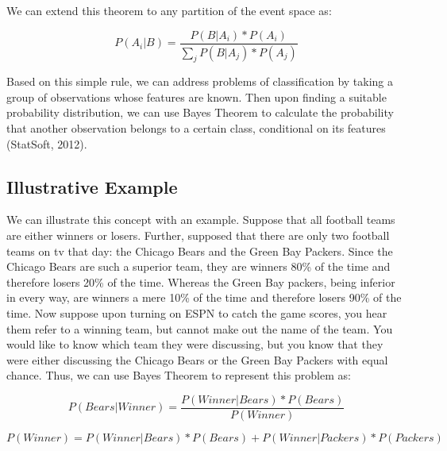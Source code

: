 \begin{flushleft}We can extend this theorem to any partition of the event space as:
\end{flushleft}

\begin{equation}
P(A_{i}|B)=\frac{P(B|A_{i})*P(A_{i})}{\sum_{j}P(B|A_{j})*P(A_{j})}
\end{equation}

\begin{flushleft}Based on this simple rule, we can address problems of classification by taking a group of observations whose features are known. Then upon finding a suitable probability distribution, we can use Bayes Theorem to calculate the probability that another observation belongs to a certain class, conditional on its features (StatSoft, 2012). 
\end{flushleft}


\subsection{Illustrative Example} %

\begin{flushleft}We can illustrate this concept with an example. Suppose that all football teams are either winners or losers. Further, supposed that there are only two football teams on tv that day: the Chicago Bears and the Green Bay Packers. Since the Chicago Bears are such a superior team, they are winners 80\% of the time and therefore losers 20\% of the time. Whereas the Green Bay packers, being inferior in every way, are winners a mere 10\% of the time and therefore losers 90\% of the time. Now suppose upon turning on ESPN to catch the game scores, you hear them refer to a winning team, but cannot make out the name of the team. You would like to know which team they were discussing, but you know that they were either discussing the Chicago Bears or the Green Bay Packers with equal chance. Thus, we can use Bayes Theorem to represent this problem as:
\end{flushleft}

\begin{equation}
P(Bears|Winner)=\frac{P(Winner|Bears)*P(Bears)}{P(Winner)}
\end{equation}

\begin{equation}
P(Winner)=P(Winner|Bears)*P(Bears)+P(Winner|Packers)*P(Packers)
\end{equation}

